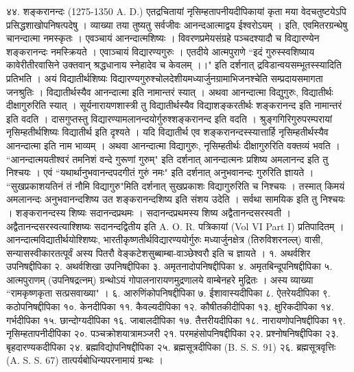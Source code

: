 ४४. शङ्करानन्दः (1275-1350 A. D.)
एतद्रचितायां नृसिम्हतापनीयदीपिकायां कृता मया वेदचतुष्टयेऽपि प्रसिद्धशाखोपनिषत्पदेषु । व्याख्या तया तुष्यतु सर्वजीवः आनन्दआत्माद्वय ईश्वरोऽयम् । इति, एवमितरग्रन्थेषु चानन्दात्मा नमस्कृतः । एवञ्चायं आनन्दात्मशिष्यः । विवरणप्रमेयसंग्रहे पञ्चदश्यादौ च विद्यारण्येन शङ्करानन्दः नमस्क्रियते । एवाञ्चायं विद्यारण्यगुरुः । एतदीये आत्मपुराणे ``इदं गुरुस्स्वशिष्याय कावेरीतीरवासिने उक्तवान् श्रद्धधानाय स्नेहादेव च केवलम् ।।" इति दर्शनात् द्रविडान्वयसम्भूतस्स्यादिति प्रतिभति ।
अयं विद्यातीर्थशिष्यः विद्यारण्यगुरुश्चोलदेशीयमध्यार्जुनग्रामाभिजनश्चेति सम्प्रदायसमागता जनश्रुतिः । विद्यातीर्थस्यैव आनन्दात्मा इति नामान्तरं स्यात् । अथवा आनन्दात्मा विद्युगुरुः, विद्यातीर्थः दीक्षागुरुरिति स्यात् । सूर्यनारायणशास्त्री तु विद्यातीर्थस्यैव विद्याशङ्करतीर्थः शङ्करानन्द इति नामान्तरं इति वदति । दासगुप्तस्तु विद्यारण्यामलानन्दयोर्गुरुश्शङ्करानन्द इति वदति । श्रुङ्गगिरिगुरुपरम्परायां नृसिम्हतीर्थशिष्यः विद्यातीर्थ इति दृश्यते । यदि विद्यातीर्थ एव शङ्करानन्दस्स्यात्तार्हि नृसिम्हतीर्थस्यैव आनन्दात्मा इति नाम भाव्यम् । अथवा आनन्दात्मा विद्यागुरुः, नृसिम्हतीर्थः दीक्षागुरुरिति वक्तव्यं भवति । ``आनन्दात्मयतीश्वरं तमनिशं वन्दे गुरूणां गुरुम्" इति दर्शनात् आनन्दात्मनः प्रशिष्य अमलानन्द इति तु निश्चयः । एवं ``यथार्थानुभवानन्दपदगीतं गुरुं नमः" इति दर्शनात् अनुभवानन्दः गुरुरिति ज्ञायते । ``सुखप्रकाशयतिनं तं नौमि विद्यागुरु"मिति दर्शनात् सुखप्रकाशः विद्यागुरुरिति च निश्चयः । तस्मात् किमयं अमलानन्दः अनुभवानन्दशिष्य उत शङ्करानन्दशिष्य इति संशय उदेति । सर्वथा सामयिक इति तु निश्चयः ।
शङ्करानन्दस्य शिष्यः सदानन्दप्रथमः । सदानन्दप्रथमस्य शिष्य अद्वैतानन्दसरस्वती । अद्वैतानन्दसरस्वत्याश्शिष्यः सदानन्दद्वितीय इति A. O. R. पत्रिकायां (Vol VI Part I) प्रतिपादितम् ।
आनन्दात्मविद्यातीर्थयोश्शिष्यः, भारतीकृष्णतीर्थविद्यारण्ययोर्गुरुः मध्यार्जुनक्षेत्र (तिरुविशरनल्ल्) वासी, सन्यासस्वीकारतत्पूर्वं अस्य पितरौ वेङ्कटेशसुब्बाम्बा-वाञ्छेश्वरौ इति च ज्ञायते ।
१. अथर्वशिर उपनिषद्दीपिका
२. अथर्वशिखा उपनिषद्दीपिका
३. अमृतनादोपनिषद्दीपिका
४. अमृतबिन्दूपनिषद्दीपिका
५. आत्मपुराणम् (उपनिषद्रत्नम्) ग्रन्थोऽयं गोपालनारायणमुद्रणालये वाम्बेनहरे मुद्रितः । अस्य व्याख्या ``रामकृष्णकृता सत्प्रसवाख्या" ।
६. आरुणिंकोपनिषद्दीपिका
७. ईशावास्यदीपिका
८. ऐतरेयदीपिका 
९. कठोपनिषद्दीपिका
१०. केनदीपिका
११. कैवल्यदीपिका
१२. कौषीतकीदीपिका
१३. क्षुरिकदीपिका
१४. गर्भदीपिका
१५. छान्दोग्यदीपिका
१६. जाबालदीपिका
१७. तैत्तरीयदीपिका
१८. नारायणोपनिषद्दीपिका
१९. नृसिम्हतापनीदीपिका
२०. पञ्चक्रोशयात्रामञ्जरी
२१. परमहंसोपनिषद्दीपिका
२२. प्रश्नोषनिषद्दीपिका
२३. बृहदारण्यकदीपिका
२४. ब्रह्मविद्योपनिषद्दीपिका
२५. ब्रह्मसूत्रदीपिका (B. S. S. 91)
२६. ब्रह्मसूत्रवृत्तिः (A. S. S. 67) तात्पर्यबोधिन्यपरनामायं ग्रन्थः ।
